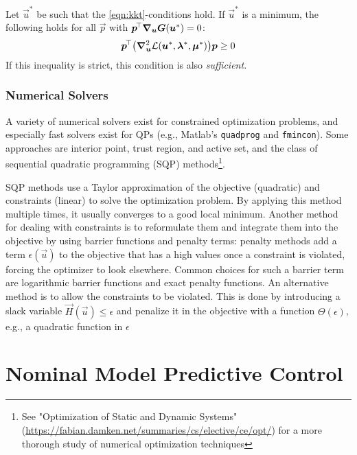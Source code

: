 			\begin{theorem}
				Let \(\vec{u}^\ast\) be such that the \ref{eqn:kkt}-conditions hold. If \(\vec{u}^\ast\) is a minimum, the following holds for all \(\vec{p}\) with \( \bm{p}^{\!\top} \grad_{\bm{u}} \bm{G}(\bm{u}^\ast) = 0 \):
				\begin{equation}
					\bm{p}^{\!\top} \bigl( \grad_{\bm{u}}^2 \mathcal{L}(\bm{u}^\ast, \bm{\lambda}^\ast, \bm{\mu}^\ast) \bigr) \bm{p} \geq 0
				\end{equation}
				If this inequality is strict, this condition is also \emph{sufficient.}
			\end{theorem}

		\subsection{Numerical Solvers}
			A variety of numerical solvers exist for constrained optimization problems, and especially fast solvers exist for QPs (e.g., Matlab's \texttt{quadprog} and \texttt{fmincon}). Some approaches are interior point, trust region, and active set, and the class of sequential quadratic programming (SQP) methods\footnote{See "Optimization of Static and Dynamic Systems" (\url{https://fabian.damken.net/summaries/cs/elective/ce/opt/}) for a more thorough study of numerical optimization techniques}.

			SQP methods use a Taylor approximation of the objective (quadratic) and constraints (linear) to solve the optimization problem. By applying this method multiple times, it usually converges to a good local minimum. Another method for dealing with constraints is to reformulate them and integrate them into the objective by using barrier functions and penalty terms: penalty methods add a term \(\epsilon(\vec{u})\) to the objective that has a high values once a constraint is violated, forcing the optimizer to look elsewhere. Common choices for such a barrier term are logarithmic barrier functions and exact penalty functions. An alternative method is to allow the constraints to be violated. This is done by introducing a slack variable \( \vec{H}(\vec{u}) \leq \epsilon \) and penalize it in the objective with a function \( \Theta(\epsilon) \), e.g., a quadratic function in \(\epsilon\)


\chapter{Nominal Model Predictive Control}
	\label{c:mpcNominal}

